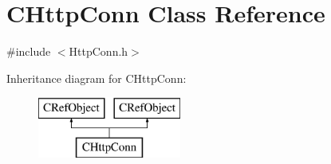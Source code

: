 \hypertarget{class_c_http_conn}{}\section{C\+Http\+Conn Class Reference}
\label{class_c_http_conn}


{\ttfamily \#include $<$Http\+Conn.\+h$>$}

Inheritance diagram for C\+Http\+Conn\+:\begin{figure}[H]
\begin{center}
\leavevmode
\includegraphics[height=2.000000cm]{class_c_http_conn}
\end{center}
\end{figure}
